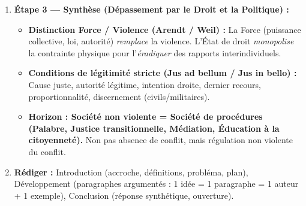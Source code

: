 \documentclass[11pt]{article}
\newcommand{\cle}[1]{{\popxbold\color{popdark}#1}}
\begin{document}
\begin{methode}
\begin{enumerate}
\begin{itemize}
            \item \textbf{Critique politique (Arendt, \emph{De la violence}) :} \guillemotleft La violence est muette \guillemotright. Elle détruit le \cle{pouvoir} (capacité d'agir ensemble par la parole). Elle est \emph{instrumentale} mais \emph{irrationnelle} : elle ne peut \emph{créer} du pouvoir, seulement le détruire.
            \item \textbf{Critique éthique (Kant, Levinas) :} Violence = traitement de l'autre comme \cle{moyen} (Kant) / \cle{visage} nié (Levinas). Atteinte à la \cle{dignité} intrinsèque.
            \item \textbf{Inefficacité historique :} Révolutions violentes $\rightarrow$ Terreur, nouveaux despotismes (Robespierre, Staline, Pol Pot). \guillemotleft Qui sème le vent récolte la tempête \guillemotright.
        \end{itemize}
    \item \textbf{Étape 3 — Synthèse (Dépassement par le Droit et la Politique) :}
        \begin{itemize}
            \item \textbf{Distinction \cle{Force / Violence} (Arendt / Weil) :} La \cle{Force} (puissance collective, loi, autorité) \emph{remplace} la violence. L'État de droit \emph{monopolise} la contrainte physique pour l'\emph{éradiquer} des rapports interindividuels.
            \item \textbf{Conditions de légitimité stricte (Jus ad bellum / Jus in bello) :} Cause juste, autorité légitime, intention droite, dernier recours, proportionnalité, discernement (civils/militaires).
            \item \textbf{Horizon : Société non violente = Société de \cle{procédures} (Palabre, Justice transitionnelle, Médiation, Éducation à la citoyenneté).} Non pas absence de conflit, mais \cle{régulation non violente} du conflit.
        \end{itemize}
    \item \textbf{Rédiger :} Introduction (accroche, définitions, probléma, plan), Développement (paragraphes argumentés : 1 idée = 1 paragraphe = 1 auteur + 1 exemple), Conclusion (réponse synthétique, ouverture).
\end{enumerate}
\end{methode}
\end{document}

